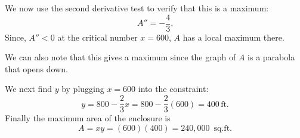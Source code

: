\documentclass{ximera}
\begin{document}
\begin{example}[example 1]
We now use the second derivative test to verify that this is a maximum:
\[
A'' = -\frac43.
\]
Since, $A'' < 0$ at the critical number $x = 600$, $A$ has a local maximum there.

We can also note that this gives a maximum since the graph of $A$ is a parabola that opens down.


\begin{image}
\end{image}


We next find $y$ by plugging $x = 600$ into the constraint:
\[y = 800 - \frac23 x = 800 - \frac23(600) = 400 \,\mbox{ft.}\]
Finally the maximum area of the enclosure is
\[A = xy = (600)(400) = 240{,}000 \,\mbox{ sq.ft.}\]
\end{example}


\begin{center}
\begin{foldable}
\end{foldable}
\end{center}
\end{document}
